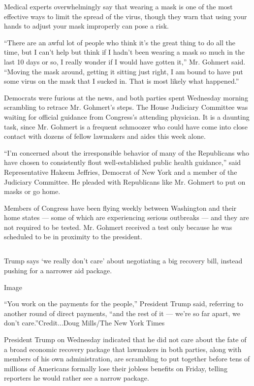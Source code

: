 Medical experts overwhelmingly say that wearing a mask is one of the
most effective ways to limit the spread of the virus, though they warn
that using your hands to adjust your mask improperly can pose a risk.

``There are an awful lot of people who think it's the great thing to do
all the time, but I can't help but think if I hadn't been wearing a mask
so much in the last 10 days or so, I really wonder if I would have
gotten it,'' Mr. Gohmert said. ``Moving the mask around, getting it
sitting just right, I am bound to have put some virus on the mask that I
sucked in. That is most likely what happened.''

Democrats were furious at the news, and both parties spent Wednesday
morning scrambling to retrace Mr. Gohmert's steps. The House Judiciary
Committee was waiting for official guidance from Congress's attending
physician. It is a daunting task, since Mr. Gohmert is a frequent
schmoozer who could have come into close contact with dozens of fellow
lawmakers and aides this week alone.

``I'm concerned about the irresponsible behavior of many of the
Republicans who have chosen to consistently flout well-established
public health guidance,'' said Representative Hakeem Jeffries, Democrat
of New York and a member of the Judiciary Committee. He pleaded with
Republicans like Mr. Gohmert to put on masks or go home.

Members of Congress have been flying weekly between Washington and their
home states --- some of which are experiencing serious outbreaks --- and
they are not required to be tested. Mr. Gohmert received a test only
because he was scheduled to be in proximity to the president.

\hypertarget{-2}{%
\subsection{}\label{-2}}

Trump says `we really don't care' about negotiating a big recovery bill,
instead pushing for a narrower aid package.

Image

``You work on the payments for the people,'' President Trump said,
referring to another round of direct payments, ``and the rest of it ---
we're so far apart, we don't care.''Credit...Doug Mills/The New York
Times

President Trump on Wednesday indicated that he did not care about the
fate of a broad economic recovery package that lawmakers in both
parties, along with members of his own administration, are scrambling to
put together before tens of millions of Americans formally lose their
jobless benefits on Friday, telling reporters he would rather see a
narrow package.

